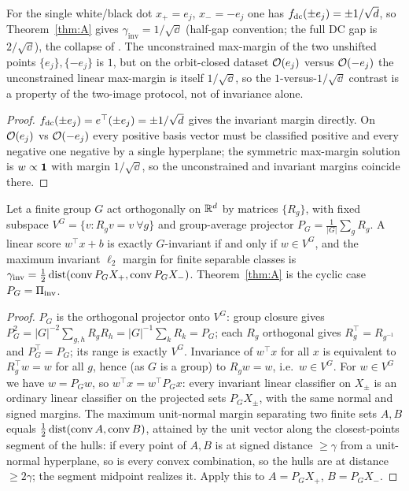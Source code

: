 \begin{corollary}\label{cor:ge-recover}
For the single white/black dot $x_+=e_j$, $x_-=-e_j$ one has
$f_{\mathrm{dc}}(\pm e_j)=\pm1/\sqrt{d}$, so Theorem~\ref{thm:A} gives
$\gamma_{\mathrm{inv}}=1/\sqrt\dd$ (half-gap convention; the full DC gap is
$2/\sqrt\dd$), the collapse of \citet{ge2021shift}. The unconstrained max-margin
of the two unshifted points $\{e_j\},\{-e_j\}$ is $1$, but on the orbit-closed
dataset $\mathcal O(e_j)$ versus $\mathcal O(-e_j)$ the unconstrained linear max-margin is
itself $1/\sqrt\dd$, so the $1$-versus-$1/\sqrt\dd$ contrast is a property of the
two-image protocol, not of invariance alone.
\end{corollary}
\begin{proof}
$f_{\mathrm{dc}}(\pm e_j)=e^\top(\pm e_j)=\pm1/\sqrt{d}$ gives the invariant margin
directly. On $\mathcal O(e_j)$ vs $\mathcal O(-e_j)$ every positive basis vector must be
classified positive and every negative one negative by a single hyperplane; the
symmetric max-margin solution is $w\propto\mathbf 1$ with margin $1/\sqrt\dd$, so the
unconstrained and invariant margins coincide there.
\end{proof}

\begin{proposition}\label{prop:finite-group-app}
Let a finite group $G$ act orthogonally on $\mathbb{R}^d$ by matrices $\{R_g\}$, with
fixed subspace $V^G=\{v:R_gv=v\ \forall g\}$ and group-average projector
$P_G=\tfrac1{|G|}\sum_{g}R_g$. A linear score $w^\top x+b$ is exactly
$G$-invariant if and only if $w\in V^G$, and the maximum invariant $\ell_2$
margin for finite separable classes is
$\gamma_{\mathrm{inv}}=\tfrac12\operatorname{dist}(\operatorname{conv} P_GX_+,\operatorname{conv} P_GX_-)$.
Theorem~\ref{thm:A} is the cyclic case $P_G=\Pi_{\mathrm{inv}}$.
\end{proposition}
\begin{proof}
$P_G$ is the orthogonal projector onto $V^G$: group closure gives
$P_G^2=|G|^{-2}\sum_{g,h}R_gR_h=|G|^{-1}\sum_kR_k=P_G$; each $R_g$ orthogonal
gives $R_g^\top=R_{g^{-1}}$ and $P_G^\top=P_G$; its range is exactly $V^G$.
Invariance of $w^\top x$ for all $x$ is equivalent to $R_g^\top w=w$ for all $g$,
hence (as $G$ is a group) to $R_gw=w$, i.e.\ $w\in V^G$. For $w\in V^G$ we have
$w=P_Gw$, so $w^\top x=w^\top P_Gx$: every invariant linear classifier on
$X_\pm$ is an ordinary linear classifier on the projected sets $P_GX_\pm$, with
the same normal and signed margins. The maximum unit-normal margin separating
two finite sets $A,B$ equals $\tfrac12\operatorname{dist}(\operatorname{conv} A,\operatorname{conv} B)$, attained by the
unit vector along the closest-points segment of the hulls: if every point of
$A,B$ is at signed distance $\ge\gamma$ from a unit-normal hyperplane, so is
every convex combination, so the hulls are at distance $\ge2\gamma$; the segment
midpoint realizes it. Apply this to $A=P_GX_+$, $B=P_GX_-$.
\end{proof}

